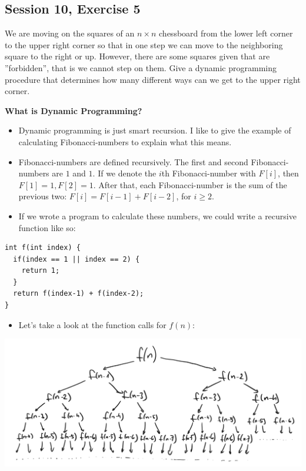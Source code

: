 \subsection {Session 10, Exercise 5}

\label{session_10_exercise_5}


We are moving on the squares of an $n \times n$ chessboard from the lower left corner to the upper right corner so that in one step we can move to the neighboring square to the right or up. However, there are some squares given that are ''forbidden'', that is we cannot step on them. Give a dynamic programming procedure that determines how many different ways can we get to the upper right corner.


\textbf{What is Dynamic Programming?}

\begin{itemize}
    \item Dynamic programming is just smart recursion. I like to give the example of calculating Fibonacci-numbers to explain what this means.
    \item Fibonacci-numbers are defined recursively. The first and second Fibonacci-numbers are $1$ and $1$. If we denote the $i$th Fibonacci-number with $F[i]$, then $F[1]=1, F[2]=1$. After that, each Fibonacci-number is the sum of the previous two: $F[i] = F[i-1] + F[i-2]$, for $i\geq{}2$.
    \item If we wrote a program to calculate these numbers, we could write a recursive function like so:
\end{itemize}


\begin{verbatim}
int f(int index) {
  if(index == 1 || index == 2) {
    return 1;
  }
  return f(index-1) + f(index-2);
}
\end{verbatim}

\begin{itemize}
    \item Let's take a look at the function calls for $f(n)$:
\end{itemize}

\begin{center}
    \includegraphics[width=\linewidth]{10/05/fibonacci_recursive.png}
\end{center}


